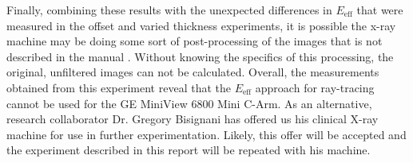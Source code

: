 Finally, combining these results with the unexpected differences in $E_{\text{eff}}$ that were measured in the offset and varied thickness experiments, it is possible the x-ray machine may be doing some sort of post-processing of the images that is not described in the manual \cite{CArm}. Without knowing the specifics of this processing, the original, unfiltered images can not be calculated. Overall, the measurements obtained from this experiment reveal that the $E_{\text{eff}}$ approach for ray-tracing cannot be used for the GE MiniView 6800 Mini C-Arm. As an alternative, research collaborator Dr. Gregory Bisignani has offered us his clinical X-ray machine for use in further experimentation. Likely, this offer will be accepted and the experiment described in this report will be repeated with his machine.

